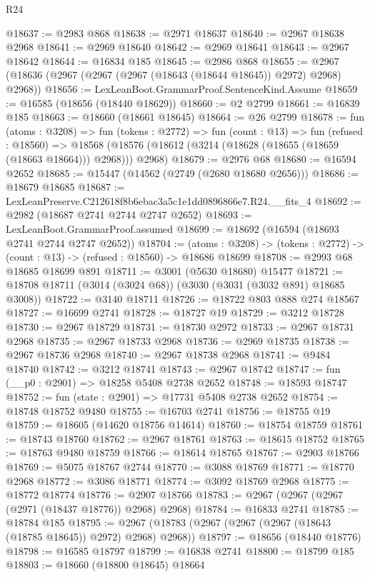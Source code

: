 \begin{lexlean}{R24}
\begin{coremodule}
@18637 := @2983 @868
@18638 := @2971 @18637
@18640 := @2967 @18638 @2968
@18641 := @2969 @18640
@18642 := @2969 @18641
@18643 := @2967 @18642
@18644 := @16834 @185
@18645 := @2986 @868
@18655 := @2967 (@18636 (@2967 (@2967 (@2967 (@18643 (@18644 @18645)) @2972) @2968) @2968))
@18656 := LexLeanBoot.GrammarProof.SentenceKind.Assume
@18659 := @16585 (@18656 (@18440 @18629))
@18660 := @2 @2799
@18661 := @16839 @185
@18663 := @18660 (@18661 @18645)
@18664 := @26 @2799
@18678 := fun (atoms : @3208) =>
  fun (tokens : @2772) =>
  fun (count : @13) =>
  fun (refused : @18560) =>
  @18568 (@18576 (@18612 (@3214 (@18628 (@18655 (@18659 (@18663 @18664))) @2968))) @2968)
@18679 := @2976 @68
@18680 := @16594 @2652
@18685 := @15447 (@14562 (@2749 (@2680 @18680 @2656)))
@18686 := @18679 @18685
@18687 := LexLeanPreserve.C212618f8b6ebac3a5c1e1dd0896866e7.R24.__fits_4
@18692 := @2982 (@18687 @2741 @2744 @2747 @2652)
@18693 := LexLeanBoot.GrammarProof.assumed
@18699 := @18692 (@16594 (@18693 @2741 @2744 @2747 @2652))
@18704 := (atoms : @3208) ->
  (tokens : @2772) -> (count : @13) -> (refused : @18560) -> @18686 @18699
@18708 := @2993 @68 @18685 @18699 @891
@18711 := @3001 (@5630 @18680) @15477
@18721 := @18708 @18711 (@3014 (@3024 @68)) (@3030 (@3031 (@3032 @891) @18685 @3008))
@18722 := @3140 @18711
@18726 := @18722 @803 @888 @274 @18567
@18727 := @16699 @2741
@18728 := @18727 @19
@18729 := @3212 @18728
@18730 := @2967 @18729
@18731 := @18730 @2972
@18733 := @2967 @18731 @2968
@18735 := @2967 @18733 @2968
@18736 := @2969 @18735
@18738 := @2967 @18736 @2968
@18740 := @2967 @18738 @2968
@18741 := @9484 @18740
@18742 := @3212 @18741
@18743 := @2967 @18742
@18747 := fun (__p0 : @2901) => @18258 @5408 @2738 @2652
@18748 := @18593 @18747
@18752 := fun (state : @2901) => @17731 @5408 @2738 @2652
@18754 := @18748 @18752 @9480
@18755 := @16703 @2741
@18756 := @18755 @19
@18759 := @18605 (@14620 @18756 @14614)
@18760 := @18754 @18759
@18761 := @18743 @18760
@18762 := @2967 @18761
@18763 := @18615 @18752
@18765 := @18763 @9480 @18759
@18766 := @18614 @18765
@18767 := @2903 @18766
@18769 := @5075 @18767 @2744
@18770 := @3088 @18769
@18771 := @18770 @2968
@18772 := @3086 @18771
@18774 := @3092 @18769 @2968
@18775 := @18772 @18774
@18776 := @2907 @18766
@18783 := @2967 (@2967 (@2967 (@2971 (@18437 @18776)) @2968) @2968)
@18784 := @16833 @2741
@18785 := @18784 @185
@18795 := @2967 (@18783 (@2967 (@2967 (@2967 (@18643 (@18785 @18645)) @2972) @2968) @2968))
@18797 := @18656 (@18440 @18776)
@18798 := @16585 @18797
@18799 := @16838 @2741
@18800 := @18799 @185
@18803 := @18660 (@18800 @18645) @18664

\end{coremodule}
\end{lexlean}
